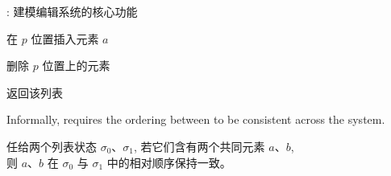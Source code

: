 \begin{frame}{}
  \centerline{\Large {}: 建模编辑系统的核心功能}
  \vspace{0.30cm}

  \begin{center}
    \begin{minipage}{0.70\textwidth}
      \begin{description}
	\setlength{\itemsep}{10pt}
	\item[$\textsc{Ins}(a, p):$] 在 $p$ 位置插入元素 $a$
	\item[$\textsc{Del}(p):$] 删除 $p$ 位置上的元素
	\item[$\textsc{Read}:$] 返回该列表
      \end{description}
    \end{minipage}
  \end{center}
\end{frame}

\begin{frame}{}

  \vspace{0.20cm}
  \begin{cdef}
    Informally, \wlspec{} requires the ordering between  to be consistent across the system.
  \end{cdef}

  \vspace{0.60cm}
  \centerline{}
\end{frame}

\begin{frame}{}
  \begin{cdef}
    任给两个列表状态 $\sigma_0$、$\sigma_1$, 若它们含有两个共同元素 $a$、$b$, \\
    则 $a$、$b$ 在 $\sigma_0$ 与 $\sigma_1$ 中的相对顺序保持一致。
  \end{cdef}

  \vspace{0.30cm}
  \begin{columns}
      \vspace{-0.60cm}
    \pause
      \vspace{-0.60cm}
  \end{columns}
\end{frame}

